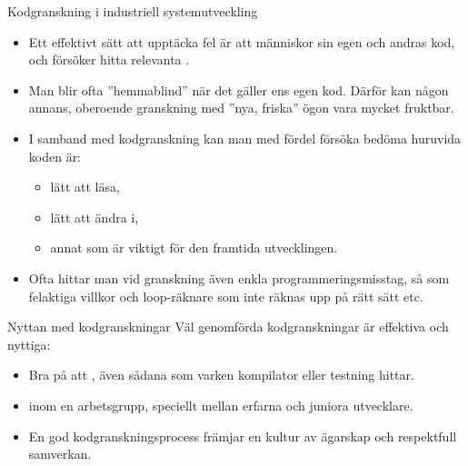 \begin{Slide}{Kodgranskning i industriell systemutveckling}
\begin{itemize}
\item Ett effektivt sätt att upptäcka fel är att människor  sin egen och andras kod, och försöker hitta relevanta . 
\item Man blir ofta ''hemmablind'' när det gäller ens egen kod. Därför kan någon annans, oberoende granskning med ''nya, friska'' ögon vara mycket fruktbar. 
\item I samband med kodgranskning kan man med fördel försöka bedöma  huruvida koden är:
\begin{itemize}
\item lätt att läsa, 
\item lätt att ändra i,  
\item annat som är viktigt för den framtida utvecklingen.
\end{itemize}
\item Ofta hittar man vid granskning även enkla programmeringsmisstag, så som felaktiga villkor och loop-räknare som inte räknas upp på rätt sätt etc.
\end{itemize}
\end{Slide}

\begin{Slide}{Nyttan med kodgranskningar}
Väl genomförda kodgranskningar är effektiva och nyttiga:
\begin{itemize}
\item Bra på att , även sådana som varken kompilator eller testning hittar.
\item {} inom en arbetsgrupp, speciellt mellan erfarna och juniora utvecklare.
\item En god kodgranskningsprocess främjar en kultur av  ägarskap och respektfull samverkan.
\end{itemize}
\end{Slide}




